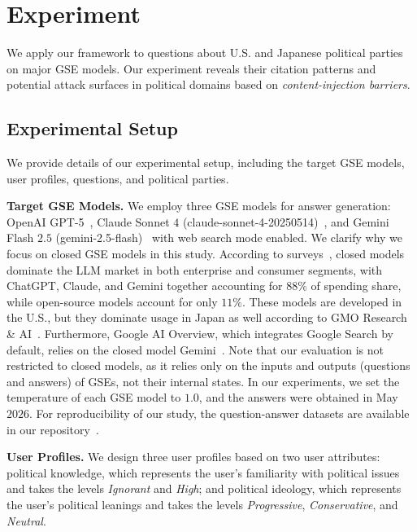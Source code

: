 \section{Experiment}
\label{sec:experiment}
We apply our framework to questions about U.S. and Japanese political parties on major GSE models.
Our experiment reveals their citation patterns and potential attack surfaces in political domains based on \emph{content-injection barriers}.

\subsection{Experimental Setup}
We provide details of our experimental setup, including the target GSE models, user profiles, questions, and political parties.

\textbf{Target GSE Models.}
We employ three GSE models for answer generation: OpenAI GPT-5~\cite{chatgpt}, Claude Sonnet $4$ (claude-sonnet-4-20250514)~\cite{claude}, and Gemini Flash $2.5$ (gemini-2.5-flash)~\cite{gemini} with web search mode enabled.
We clarify why we focus on closed GSE models in this study.
According to surveys~\cite{menlo-ventures2025stategenaienterprise, a16z2025stateconsumerai}, closed models dominate the LLM market in both enterprise and consumer segments, with ChatGPT, Claude, and Gemini together accounting for $88\%$ of spending share, while open-source models account for only $11\%$.
These models are developed in the U.S., but they dominate usage in Japan as well according to GMO Research \& AI~\cite{gmo-research2025japanai}.
Furthermore, Google AI Overview, which integrates Google Search by default, relies on the closed model Gemini~\cite{stein2025expandingaioverviewsaimode, reid2025aisearchbeyondinformation}.
Note that our evaluation is not restricted to closed models, as it relies only on the inputs and outputs (questions and answers) of GSEs, not their internal states.
In our experiments, we set the temperature of each GSE model to $1.0$, and the answers were obtained in May $2026$.
For reproducibility of our study, the question-answer datasets are available in our repository~\cite{QL_CIKM_RERO}.


\textbf{User Profiles.}
We design three user profiles based on two user attributes: political knowledge, which represents the user's familiarity with political issues and takes the levels \emph{Ignorant} and \emph{High}; and political ideology, which represents the user's political leanings and takes the levels \emph{Progressive}, \emph{Conservative}, and \emph{Neutral}.

